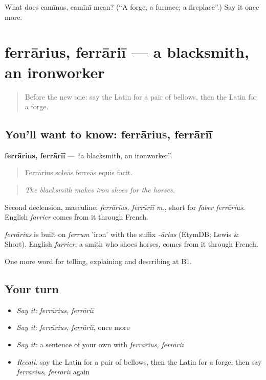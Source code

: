 \begin{tcolorbox}[breakable,colback=teal!4,colframe=teal!35!black,title={Before you move on}]
What does camīnus, camīnī mean? (\textquotedblleft{}A forge, a furnace; a fireplace\textquotedblright{}.) Say it once more.
\end{tcolorbox}
\section[ferrārius, ferrāriī]{ferrārius, ferrāriī — a blacksmith, an ironworker}

\label{lesson:LA-C469-ferrarius}



\begin{quote}
Before the new one: say the Latin for a pair of bellows, then the Latin for a forge.
\end{quote}

\subsection*{You'll want to know: ferrārius, ferrāriī}
\textbf{ferrārius, ferrāriī} — \textquotedblleft{}a blacksmith, an ironworker\textquotedblright{}.

\begin{quote}
Ferrārius soleās ferreās equīs facit.
\end{quote}

\begin{quote}
\emph{The blacksmith makes iron shoes for the horses.}
\end{quote}

Second declension, masculine: \emph{ferrārius, ferrāriī m.}, short for \emph{faber ferrārius}. English \emph{farrier} comes from it through French.

\begin{cousinweb}
\emph{ferrārius} is built on \emph{ferrum} 'iron' with the suffix \emph{-ārius} (EtymDB; Lewis \& Short). English \emph{farrier}, a smith who shoes horses, comes from it through French.
\end{cousinweb}

\begin{grammarlens}[title={What you've built}]
One more word for telling, explaining and describing at B1.
\end{grammarlens}

\subsection*{Your turn}
\begin{itemize}
\raggedright
  \item \emph{Say it:} \emph{ferrārius, ferrāriī}
  \item \emph{Say it:} \emph{ferrārius, ferrāriī}, once more
  \item \emph{Say it:} a sentence of your own with \emph{ferrārius, ferrāriī}
  \item \emph{Recall:} say the Latin for a pair of bellows, then the Latin for a forge, then say \emph{ferrārius, ferrāriī} again
\end{itemize}

